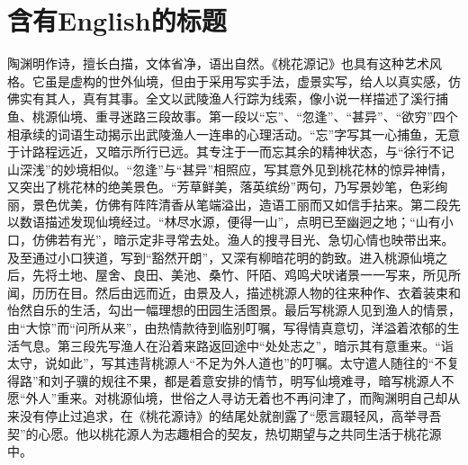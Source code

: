 \documentclass[type=doctor]{cquthesis}
\begin{document}
	\frontmatter
	
	\makecover
	
	\mainmatter
	\chapter{含有English的标题}
	陶渊明作诗，擅长白描，文体省净，语出自然。《桃花源记》也具有这种艺术风格。它虽是虚构的世外仙境，但由于采用写实手法，虚景实写，给人以真实感，仿佛实有其人，真有其事。全文以武陵渔人行踪为线索，像小说一样描述了溪行捕鱼、桃源仙境、重寻迷路三段故事。第一段以“忘”、“忽逢”、“甚异”、“欲穷”四个相承续的词语生动揭示出武陵渔人一连串的心理活动。“忘”字写其一心捕鱼，无意于计路程远近，又暗示所行已远。其专注于一而忘其余的精神状态，与“徐行不记山深浅”的妙境相似。“忽逢”与“甚异”相照应，写其意外见到桃花林的惊异神情，又突出了桃花林的绝美景色。“芳草鲜美，落英缤纷”两句，乃写景妙笔，色彩绚丽，景色优美，仿佛有阵阵清香从笔端溢出，造语工丽而又如信手拈来。第二段先以数语描述发现仙境经过。“林尽水源，便得一山”，点明已至幽迥之地；“山有小口，仿佛若有光”，暗示定非寻常去处。渔人的搜寻目光、急切心情也映带出来。及至通过小口狭道，写到“豁然开朗”，又深有柳暗花明的韵致。进入桃源仙境之后，先将土地、屋舍、良田、美池、桑竹、阡陌、鸡鸣犬吠诸景一一写来，所见所闻，历历在目。然后由远而近，由景及人，描述桃源人物的往来种作、衣着装束和怡然自乐的生活，勾出一幅理想的田园生活图景。最后写桃源人见到渔人的情景，由“大惊”而“问所从来”，由热情款待到临别叮嘱，写得情真意切，洋溢着浓郁的生活气息。第三段先写渔人在沿着来路返回途中“处处志之”，暗示其有意重来。“诣太守，说如此”，写其违背桃源人“不足为外人道也”的叮嘱。太守遣人随往的“不复得路”和刘子骥的规往不果，都是着意安排的情节，明写仙境难寻，暗写桃源人不愿“外人”重来。对桃源仙境，世俗之人寻访无着也不再问津了，而陶渊明自己却从来没有停止过追求，在《桃花源诗》的结尾处就剖露了“愿言蹑轻风，高举寻吾契”的心愿。他以桃花源人为志趣相合的契友，热切期望与之共同生活于桃花源中。
	
	
	
\end{document}
